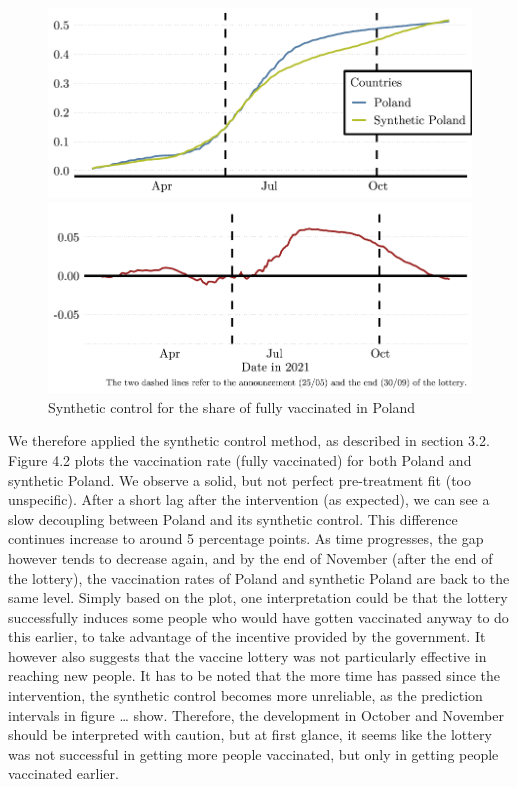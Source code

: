 \documentclass{scrbook}
\begin{document}
\begin{figure}[h]
\caption{Synthetic control for the share of fully vaccinated in Poland}

\begin{center}\includegraphics{bachelor_thesis_files/figure-latex/unnamed-chunk-3-1} \end{center}



\begin{center}\includegraphics{bachelor_thesis_files/figure-latex/unnamed-chunk-3-2} \end{center}
\end{figure}

We therefore applied the synthetic control method, as described in
section 3.2. Figure 4.2 plots the vaccination rate (fully vaccinated)
for both Poland and synthetic Poland. We observe a solid, but not
perfect pre-treatment fit (too unspecific). After a short lag after the
intervention (as expected), we can see a slow decoupling between Poland
and its synthetic control. This difference continues increase to around
5 percentage points. As time progresses, the gap however tends to
decrease again, and by the end of November (after the end of the
lottery), the vaccination rates of Poland and synthetic Poland are back
to the same level. Simply based on the plot, one interpretation could be
that the lottery successfully induces some people who would have gotten
vaccinated anyway to do this earlier, to take advantage of the incentive
provided by the government. It however also suggests that the vaccine
lottery was not particularly effective in reaching new people. It has to
be noted that the more time has passed since the intervention, the
synthetic control becomes more unreliable, as the prediction intervals
in figure \ldots{} show. Therefore, the development in October and
November should be interpreted with caution, but at first glance, it
seems like the lottery was not successful in getting more people
vaccinated, but only in getting people vaccinated earlier.
\end{document}
